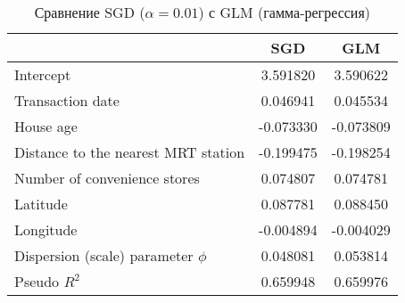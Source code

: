 \documentclass[a4paper]{article}
\begin{document}
\begin{table}[h]
    \caption{Сравнение \textsf{SGD} ($\alpha=0.01$) с \textsf{GLM} (гамма-регрессия)}
    \centering
    \begin{tabular}{|l|c|c|}
        \hline
                                            & \textsf{SGD} & \textsf{GLM} \\
        \hline
        Intercept                           & 3.591820     & 3.590622     \\
        Transaction date                    & 0.046941     & 0.045534     \\
        House age                           & -0.073330    & -0.073809    \\
        Distance to the nearest MRT station & -0.199475    & -0.198254    \\
        Number of convenience stores        & 0.074807     & 0.074781     \\
        Latitude                            & 0.087781     & 0.088450     \\
        Longitude                           & -0.004894    & -0.004029    \\
        Dispersion (scale) parameter $\phi$ & 0.048081     & 0.053814     \\
        \hhline{===}
        Pseudo $R^2$                        & 0.659948     & 0.659976     \\
        \hline
    \end{tabular}
    \label{tab:real_estate_glm}
\end{table}
\end{document}
